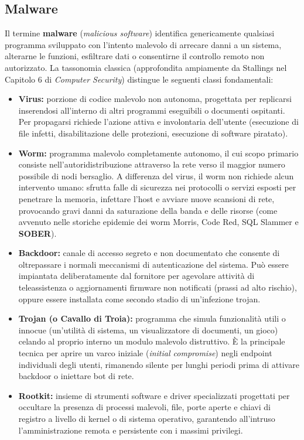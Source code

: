 \documentclass[../../main.tex]{subfiles}
\begin{document}
\subsection{Malware}
\label{subsec:malware}

Il termine \textbf{malware} (\textit{malicious software}) identifica genericamente qualsiasi programma sviluppato con l'intento malevolo di arrecare danni a un sistema, alterarne le funzioni, esfiltrare dati o consentirne il controllo remoto non autorizzato. La tassonomia classica (approfondita ampiamente da Stallings nel Capitolo 6 di \textit{Computer Security}) distingue le seguenti classi fondamentali:

\begin{itemize}
    \item \textbf{Virus:} porzione di codice malevolo non autonoma, progettata per replicarsi inserendosi all'interno di altri programmi eseguibili o documenti ospitanti. Per propagarsi richiede l'azione attiva e involontaria dell'utente (esecuzione di file infetti, disabilitazione delle protezioni, esecuzione di software piratato).
    \item \textbf{Worm:} programma malevolo completamente autonomo, il cui scopo primario consiste nell'autoridistribuzione attraverso la rete verso il maggior numero possibile di nodi bersaglio. A differenza del virus, il worm non richiede alcun intervento umano: sfrutta falle di sicurezza nei protocolli o servizi esposti per penetrare la memoria, infettare l'host e avviare nuove scansioni di rete, provocando gravi danni da saturazione della banda e delle risorse (come avvenuto nelle storiche epidemie dei worm Morris, Code Red, SQL Slammer e \textbf{SOBER}).
    \item \textbf{Backdoor:} canale di accesso segreto e non documentato che consente di oltrepassare i normali meccanismi di autenticazione del sistema. Può essere impiantata deliberatamente dal fornitore per agevolare attività di teleassistenza o aggiornamenti firmware non notificati (prassi ad alto rischio), oppure essere installata come secondo stadio di un'infezione trojan.
    \item \textbf{Trojan (o Cavallo di Troia):} programma che simula funzionalità utili o innocue (un'utilità di sistema, un visualizzatore di documenti, un gioco) celando al proprio interno un modulo malevolo distruttivo. È la principale tecnica per aprire un varco iniziale (\textit{initial compromise}) negli endpoint individuali degli utenti, rimanendo silente per lunghi periodi prima di attivare backdoor o iniettare bot di rete.
    \item \textbf{Rootkit:} insieme di strumenti software e driver specializzati progettati per occultare la presenza di processi malevoli, file, porte aperte e chiavi di registro a livello di kernel o di sistema operativo, garantendo all'intruso l'amministrazione remota e persistente con i massimi privilegi.
\end{itemize}
\end{document}
